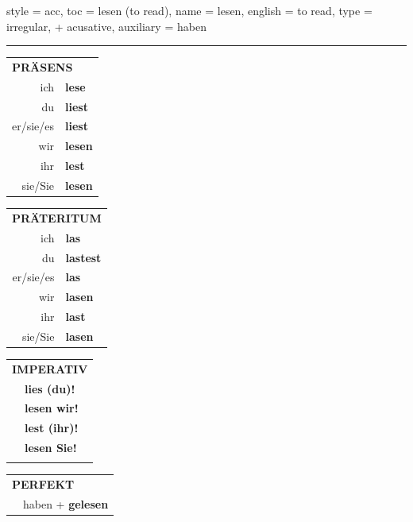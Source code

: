 \begin{verbentry}{
  style = {acc},
  toc = {lesen (to read)},
  name = {lesen},
  english = {to read},
  type = {irregular, + acusative},
  auxiliary = {haben}
}
 
    
     \vspace{5pt}

    \hrule
    
    \vspace{5pt}

  \begin{tabular}{rl}
     \multicolumn{2}{l}{\textbf{PRÄSENS} }\\
    ich & \textbf{lese}\\
    du & \textbf{liest}\\
    er/sie/es & \textbf{liest}\\
    wir & \textbf{lesen}\\
    ihr & \textbf{lest}\\
    sie/Sie & \textbf{lesen}\\
  \end{tabular}
  \hfill
     \begin{tabular}{rl}
    \multicolumn{2}{l}{\textbf{PRÄTERITUM} }\\
    ich & \textbf{las}\\
    du & \textbf{lastest}\\
    er/sie/es & \textbf{las}\\
    wir & \textbf{lasen}\\
    ihr & \textbf{last}\\
    sie/Sie & \textbf{lasen}\\
  \end{tabular}
  \hfill
  \begin{tabular}{rl}
     \multicolumn{2}{l}{\textbf{IMPERATIV} }\\
   & \textbf{lies (du)!}\\
   & \textbf{lesen wir!}\\
   & \textbf{lest (ihr)!}\\
   & \textbf{lesen Sie!}\\
   & \vspace{10pt}
  \end{tabular}

    \vspace{10pt}

 \begin{tabular}{rl}
     \multicolumn{2}{l}{\textbf{PERFEKT}}\\
  &  haben + \textbf{gelesen}\\
  \end{tabular}
\hfill
   \begin{tabular}{rl}
   

\end{tabular}
\end{verbentry}
